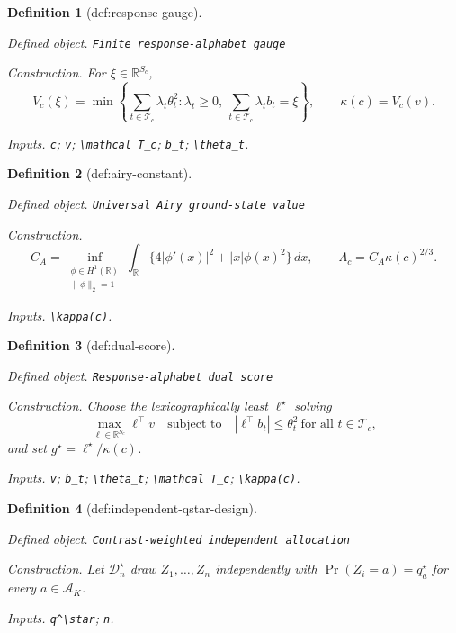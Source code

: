 \documentclass{article}
\newtheorem{definition}{Definition}
\begin{document}
\begin{definition}[def:response-gauge]\label{def:response-gauge}
\par\smallskip\noindent\emph{Defined object.} \texttt{Finite response-\allowbreak{}alphabet gauge}
\par\smallskip\noindent\emph{Construction.} For \(\xi\in\mathbb R^{S_c}\), \[V_c(\xi)=\min\left\{\sum_{t\in\mathcal T_c}\lambda_t\theta_t^2:\lambda_t\ge0,\ \sum_{t\in\mathcal T_c}\lambda_tb_t=\xi\right\},\qquad \kappa(c)=V_c(v).\]
\par\smallskip\noindent\emph{Inputs.} \texttt{c}; \texttt{v}; \texttt{\textbackslash{}\allowbreak{}mathcal T\_\allowbreak{}c}; \texttt{b\_\allowbreak{}t}; \texttt{\textbackslash{}\allowbreak{}theta\_\allowbreak{}t}.
\end{definition}

\begin{definition}[def:airy-constant]\label{def:airy-constant}
\par\smallskip\noindent\emph{Defined object.} \texttt{Universal Airy ground-\allowbreak{}state value}
\par\smallskip\noindent\emph{Construction.} \[C_A=\inf_{\substack{\phi\in H^1(\mathbb R)\\\|\phi\|_2=1}}\int_{\mathbb R}\{4|\phi'(x)|^2+|x|\phi(x)^2\}\,dx,\qquad \Lambda_c=C_A\kappa(c)^{2/3}.\]
\par\smallskip\noindent\emph{Inputs.} \texttt{\textbackslash{}\allowbreak{}kappa(c)}.
\end{definition}

\begin{definition}[def:dual-score]\label{def:dual-score}
\par\smallskip\noindent\emph{Defined object.} \texttt{Response-\allowbreak{}alphabet dual score}
\par\smallskip\noindent\emph{Construction.} Choose the lexicographically least \(\ell^\star\) solving \[\max_{\ell\in\mathbb R^{S_c}}\ell^\top v\quad\text{subject to}\quad |\ell^\top b_t|\le\theta_t^2\ \text{for all }t\in\mathcal T_c,\] and set \(g^\star=\ell^\star/\kappa(c)\).
\par\smallskip\noindent\emph{Inputs.} \texttt{v}; \texttt{b\_\allowbreak{}t}; \texttt{\textbackslash{}\allowbreak{}theta\_\allowbreak{}t}; \texttt{\textbackslash{}\allowbreak{}mathcal T\_\allowbreak{}c}; \texttt{\textbackslash{}\allowbreak{}kappa(c)}.
\end{definition}

\begin{definition}[def:independent-qstar-design]\label{def:independent-qstar-design}
\par\smallskip\noindent\emph{Defined object.} \texttt{Contrast-\allowbreak{}weighted independent allocation}
\par\smallskip\noindent\emph{Construction.} Let \(\mathcal D_n^\star\) draw \(Z_1,\ldots,Z_n\) independently with \(\Pr(Z_i=a)=q_a^\star\) for every \(a\in\mathcal A_K\).
\par\smallskip\noindent\emph{Inputs.} \texttt{q\textasciicircum{}\textbackslash{}\allowbreak{}star}; \texttt{n}.
\end{definition}
\end{document}
